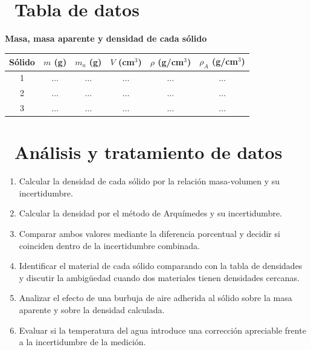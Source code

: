 \documentclass[11pt,a4paper]{article}
\newcommand{\iconotexto}[2]{\textcolor{cyanNeon}{\faIcon{#1}}~#2}
\begin{document}
\section{\iconotexto{table}{Tabla de datos}}

\begin{center}
\begin{minipage}{\linewidth}
\centering
{\small
\textbf{Masa, masa aparente y densidad de cada sólido}\par\smallskip
\begin{tabular}{@{}cccccc@{}}
\toprule
Sólido & $m$ (g) & $m_a$ (g) & $V$ (cm$^3$) & $\rho$ (g/cm$^3$) & $\rho_A$ (g/cm$^3$) \\
\midrule
1 & $\ldots$ & $\ldots$ & $\ldots$ & $\ldots$ & $\ldots$ \\
2 & $\ldots$ & $\ldots$ & $\ldots$ & $\ldots$ & $\ldots$ \\
3 & $\ldots$ & $\ldots$ & $\ldots$ & $\ldots$ & $\ldots$ \\
\bottomrule
\end{tabular}
}\par{}
\end{minipage}
\end{center}

\section{\iconotexto{calculator}{Análisis y tratamiento de datos}}

\begin{enumerate}[leftmargin=1.4em,itemsep=2pt,topsep=3pt]
  \item Calcular la densidad de cada sólido por la relación masa-volumen y su incertidumbre.
  \item Calcular la densidad por el método de Arquímedes y su incertidumbre.
  \item Comparar ambos valores mediante la diferencia porcentual y decidir si coinciden dentro de la incertidumbre combinada.
  \item Identificar el material de cada sólido comparando con la tabla de densidades y discutir la ambigüedad cuando dos materiales tienen densidades cercanas.
  \item Analizar el efecto de una burbuja de aire adherida al sólido sobre la masa aparente y sobre la densidad calculada.
  \item Evaluar si la temperatura del agua introduce una corrección apreciable frente a la incertidumbre de la medición.
\end{enumerate}
\end{document}
